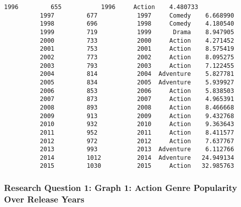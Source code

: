 \documentclass[11pt]{article}
\begin{document}
\begin{Verbatim}[commandchars=\\\{\}]
          1996         655           1996     Action    4.480733
          1997         677           1997     Comedy    6.668990
          1998         696           1998     Comedy    4.180540
          1999         719           1999      Drama    8.947905
          2000         733           2000     Action    4.271452
          2001         753           2001     Action    8.575419
          2002         773           2002     Action    8.095275
          2003         793           2003     Action    7.122455
          2004         814           2004  Adventure    5.827781
          2005         834           2005  Adventure    5.939927
          2006         853           2006     Action    5.838503
          2007         873           2007     Action    4.965391
          2008         893           2008     Action    8.466668
          2009         913           2009     Action    9.432768
          2010         932           2010     Action    9.363643
          2011         952           2011     Action    8.411577
          2012         972           2012     Action    7.637767
          2013         993           2013  Adventure    6.112766
          2014         1012          2014  Adventure   24.949134
          2015         1030          2015     Action   32.985763
\end{Verbatim}
            
    \hypertarget{research-question-1-graph-1-action-genre-popularity-over-release-years}{%
\subsubsection{Research Question 1: Graph 1: Action Genre Popularity
Over Release
Years}\label{research-question-1-graph-1-action-genre-popularity-over-release-years}}
\end{document}

